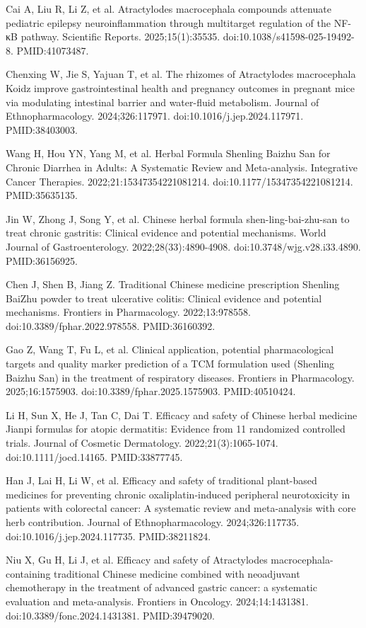 \documentclass[11pt,oneside]{book}
\newcommand{\reff}[2]{\par\hangindent=7mm\hangafter=1\noindent[#1]\hspace{2mm}#2\par}
\begin{document}
\reff{31}{Cai A, Liu R, Li Z, et al. Atractylodes macrocephala compounds attenuate pediatric epilepsy neuroinflammation through multitarget regulation of the NF-κB pathway. Scientific Reports. 2025;15(1):35535. doi:10.1038/s41598-025-19492-8. PMID:41073487.}
\reff{32}{Chenxing W, Jie S, Yajuan T, et al. The rhizomes of Atractylodes macrocephala Koidz improve gastrointestinal health and pregnancy outcomes in pregnant mice via modulating intestinal barrier and water-fluid metabolism. Journal of Ethnopharmacology. 2024;326:117971. doi:10.1016/j.jep.2024.117971. PMID:38403003.}
\reff{33}{Wang H, Hou YN, Yang M, et al. Herbal Formula Shenling Baizhu San for Chronic Diarrhea in Adults: A Systematic Review and Meta-analysis. Integrative Cancer Therapies. 2022;21:15347354221081214. doi:10.1177/15347354221081214. PMID:35635135.}
\reff{34}{Jin W, Zhong J, Song Y, et al. Chinese herbal formula shen-ling-bai-zhu-san to treat chronic gastritis: Clinical evidence and potential mechanisms. World Journal of Gastroenterology. 2022;28(33):4890-4908. doi:10.3748/wjg.v28.i33.4890. PMID:36156925.}
\reff{35}{Chen J, Shen B, Jiang Z. Traditional Chinese medicine prescription Shenling BaiZhu powder to treat ulcerative colitis: Clinical evidence and potential mechanisms. Frontiers in Pharmacology. 2022;13:978558. doi:10.3389/fphar.2022.978558. PMID:36160392.}
\reff{36}{Gao Z, Wang T, Fu L, et al. Clinical application, potential pharmacological targets and quality marker prediction of a TCM formulation used (Shenling Baizhu San) in the treatment of respiratory diseases. Frontiers in Pharmacology. 2025;16:1575903. doi:10.3389/fphar.2025.1575903. PMID:40510424.}
\reff{37}{Li H, Sun X, He J, Tan C, Dai T. Efficacy and safety of Chinese herbal medicine Jianpi formulas for atopic dermatitis: Evidence from 11 randomized controlled trials. Journal of Cosmetic Dermatology. 2022;21(3):1065-1074. doi:10.1111/jocd.14165. PMID:33877745.}
\reff{38}{Han J, Lai H, Li W, et al. Efficacy and safety of traditional plant-based medicines for preventing chronic oxaliplatin-induced peripheral neurotoxicity in patients with colorectal cancer: A systematic review and meta-analysis with core herb contribution. Journal of Ethnopharmacology. 2024;326:117735. doi:10.1016/j.jep.2024.117735. PMID:38211824.}
\reff{39}{Niu X, Gu H, Li J, et al. Efficacy and safety of Atractylodes macrocephala-containing traditional Chinese medicine combined with neoadjuvant chemotherapy in the treatment of advanced gastric cancer: a systematic evaluation and meta-analysis. Frontiers in Oncology. 2024;14:1431381. doi:10.3389/fonc.2024.1431381. PMID:39479020.}
\end{document}
